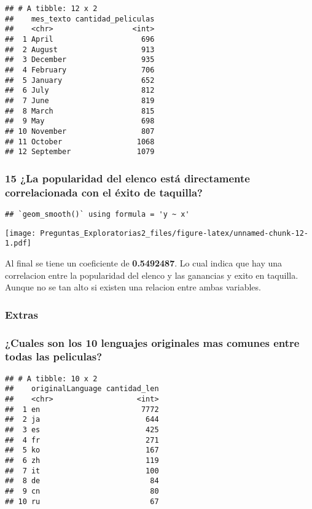\documentclass[
]{article}
\begin{document}
\begin{verbatim}
## # A tibble: 12 x 2
##    mes_texto cantidad_peliculas
##    <chr>                  <int>
##  1 April                    696
##  2 August                   913
##  3 December                 935
##  4 February                 706
##  5 January                  652
##  6 July                     812
##  7 June                     819
##  8 March                    815
##  9 May                      698
## 10 November                 807
## 11 October                 1068
## 12 September               1079
\end{verbatim}

\subsubsection{15 ¿La popularidad del elenco está directamente
correlacionada con el éxito de
taquilla?}\label{la-popularidad-del-elenco-estuxe1-directamente-correlacionada-con-el-uxe9xito-de-taquilla}

\begin{verbatim}
## `geom_smooth()` using formula = 'y ~ x'
\end{verbatim}

\texttt{[image: Preguntas\_Exploratorias2\_files/figure-latex/unnamed-chunk-12-1.pdf]}

Al final se tiene un coeficiente de \textbf{0.5492487}. Lo cual indica
que hay una correlacion entre la popularidad del elenco y las ganancias
y exito en taquilla. Aunque no se tan alto si existen una relacion entre
ambas variables.

\subsubsection{Extras}\label{extras}

\subsubsection{¿Cuales son los 10 lenguajes originales mas comunes entre
todas las
peliculas?}\label{cuales-son-los-10-lenguajes-originales-mas-comunes-entre-todas-las-peliculas}

\begin{verbatim}
## # A tibble: 10 x 2
##    originalLanguage cantidad_len
##    <chr>                   <int>
##  1 en                       7772
##  2 ja                        644
##  3 es                        425
##  4 fr                        271
##  5 ko                        167
##  6 zh                        119
##  7 it                        100
##  8 de                         84
##  9 cn                         80
## 10 ru                         67
\end{verbatim}
\end{document}
